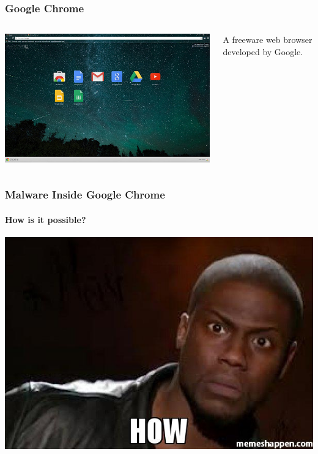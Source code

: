 \documentclass[aspectratio=169]{beamer}
\begin{document}
\begin{frame}
  \frametitle{Google Chrome}
  \begin{columns}
    \begin{column}{0.5\textwidth}
      \includegraphics[scale=0.32]{google_chrome}
    \end{column}
    \begin{column}{0.5\textwidth}
      \begin{center}
        \begin{tcolorbox}[title=\href{https://en.wikipedia.org/wiki/Google_Chrome}{Google Chrome},colback=gray]
          {\small A freeware web browser developed by Google.}
        \end{tcolorbox}
      \end{center}
    \end{column}
  \end{columns}
\end{frame}

\begin{frame}
  \frametitle{Malware Inside Google Chrome}
  \framesubtitle{How is it possible?}
  \begin{center}
    \includegraphics[scale=0.2]{how}
  \end{center}
\end{frame}
\end{document}
